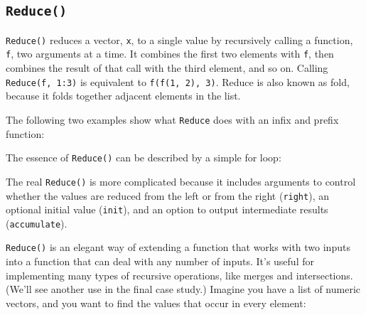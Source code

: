 \subsection{\texttt{Reduce()}}

\texttt{Reduce()} reduces a vector, \texttt{x}, to a single value by
recursively calling a function, \texttt{f}, two arguments at a time. It
combines the first two elements with \texttt{f}, then combines the
result of that call with the third element, and so on. Calling
\texttt{Reduce(f, 1:3)} is equivalent to \texttt{f(f(1, 2), 3)}. Reduce
is also known as fold, because it folds together adjacent elements in
the list.  

The following two examples show what \texttt{Reduce} does with an infix
and prefix function:

\begin{Shaded}
\begin{Highlighting}[]
\NormalTok{(}\DataTypeTok{+}\NormalTok{, }\NormalTok{:}\NormalTok{) }
\NormalTok{:}\NormalTok{) }
\end{Highlighting}
\end{Shaded}

The essence of \texttt{Reduce()} can be described by a simple for loop:

\begin{Shaded}
\begin{Highlighting}[]
\StringTok{ }
  \StringTok{ }\NormalTok{x[[}\NormalTok{]]}
  \NormalTok{(}\NormalTok{, }
    \StringTok{ }
  \NormalTok{\}}
\NormalTok{\}}
\end{Highlighting}
\end{Shaded}

The real \texttt{Reduce()} is more complicated because it includes
arguments to control whether the values are reduced from the left or
from the right (\texttt{right}), an optional initial value
(\texttt{init}), and an option to output intermediate results
(\texttt{accumulate}).

\texttt{Reduce()} is an elegant way of extending a function that works
with two inputs into a function that can deal with any number of inputs.
It's useful for implementing many types of recursive operations, like
merges and intersections. (We'll see another use in the final case
study.) Imagine you have a list of numeric vectors, and you want to find
the values that occur in every element:

